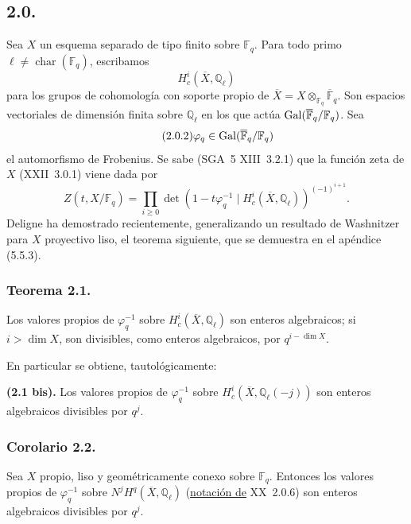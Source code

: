 \subsection*{2.0.}
Sea $X$ un esquema separado de tipo finito sobre $\mathbb F_q$. Para todo
primo $\ell\ne\operatorname{char}(\mathbb F_q)$, escribamos
\begin{equation}\tag{2.0.1}
H_c^i(\overline X,\mathbb Q_\ell)
\end{equation}
para los grupos de cohomología con soporte propio de
$\overline X=X\otimes_{\mathbb F_q}\overline{\mathbb F}_q$. Son espacios
vectoriales de dimensión finita sobre $\mathbb Q_\ell$ en los que actúa
$\operatorname{Gal}(\overline{\mathbb F}_q/\mathbb F_q)$. Sea
\begin{equation}\tag{2.0.2}
\varphi_q\in\operatorname{Gal}(\overline{\mathbb F}_q/\mathbb F_q)
\end{equation}
el automorfismo de Frobenius. Se sabe (SGA~5 XIII~3.2.1) que la función
zeta de $X$ (XXII~3.0.1) viene dada por
\begin{equation}\tag{2.0.3}
Z(t,X/\mathbb F_q)=
\prod_{i\geq0}
\det\!\left(1-t\varphi_q^{-1}\mid
H_c^i(\overline X,\mathbb Q_\ell)\right)^{(-1)^{i+1}}.
\end{equation}
Deligne ha demostrado recientemente, generalizando un resultado de
Washnitzer para $X$ proyectivo liso, el teorema siguiente, que se demuestra
en el apéndice (5.5.3).

\subsubsection*{Teorema 2.1.}
Los valores propios de $\varphi_q^{-1}$ sobre
$H_c^i(\overline X,\mathbb Q_\ell)$ son enteros algebraicos; si
$i>\dim X$, son divisibles, como enteros algebraicos, por
$q^{i-\dim X}$.

\pageoriginale

En particular se obtiene, tautológicamente:

\medskip
\noindent\textbf{(2.1 bis).}
Los valores propios de $\varphi_q^{-1}$ sobre
$H_c^i(\overline X,\mathbb Q_\ell(-j))$ son enteros algebraicos divisibles
por $q^j$.

\subsubsection*{Corolario 2.2.}
Sea $X$ propio, liso y geométricamente conexo sobre $\mathbb F_q$.
Entonces los valores propios de $\varphi_q^{-1}$ sobre
$N^jH^q(\overline X,\mathbb Q_\ell)$ (\underline{notación de} XX~2.0.6) son enteros
algebraicos divisibles por $q^j$.

